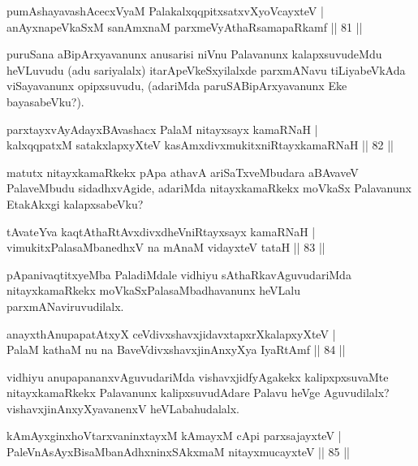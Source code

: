 \begin{shl}
pumAshayavashAcecxVyaM PalakalxqqpitxsatxvXyoVcayxteV |\\
anAyxnapeVkaSxM sanAmxnaM parxmeVyAthaRsamapaRkamf \hfill || 81 ||
\end{shl}

\begin{artha}
puruSana aBipArxyavanunx anusarisi niVnu Palavanunx kalapxsuvudeMdu heVLuvudu (adu 
sariyalalx) itarApeVkeSxyilalxde parxmANavu tiLiyabeVkAda viSayavanunx 
opipxsuvudu, (adariMda paruSABipArxyavanunx Eke bayasabeVku?).
\end{artha}

\begin{shl}
parxtayxvAyAdayxBAvashacx PalaM nitayxsayx kamaRNaH |\\
kalxqqpatxM satakxlapxyXteV kasAmxdivxmukitxniRtayxkamaRNaH \hfill || 82 ||
\end{shl}
	
\begin{artha}
matutx nitayxkamaRkekx pApa athavA ariSaTxveMbudara aBAvaveV PalaveMbudu sidadhxvAgide, adariMda nitayxkamaRkekx moVkaSx Palavanunx EtakAkxgi kalapxsabeVku?
\end{artha}

\begin{shl}
tAvateYva kaqtAthaRtAvxdivxdheVniRtayxsayx kamaRNaH |\\
vimukitxPalasaMbanedhxV na mAnaM vidayxteV tataH \hfill || 83 ||
\end{shl}

\begin{artha}
pApanivaqtitxyeMba PaladiMdale vidhiyu sAthaRkavAguvudariMda nitayxkamaRkekx moVkaSxPalasaMbadhavanunx heVLalu parxmANaviruvudilalx.
\end{artha}

\begin{shl}
anayxthA\s nupapatAtxyX ceVdivxshavxjidavxtapxrXkalapxyXteV |\\
PalaM kathaM nu na BaveVdivxshavxjinAnxyXya IyaRtAmf \hfill || 84 ||
\end{shl}

\begin{artha}
vidhiyu anupapananxvAguvudariMda vishavxjidfyAgakekx kalipxpxsuvaMte nitayxkamaRkekx Palavanunx kalipxsuvudAdare Palavu heVge Aguvudilalx? vishavxjinAnxyXyavanenxV heVLabahudalalx.
\end{artha}

\begin{shl}
kAmAyxginxhoVtarxvaninxtayxM kAmayxM cApi parxsajayxteV |\\
PaleVnAsAyxBisaMbanAdhxninxSAkxmaM nitayxmucayxteV \hfill || 85 ||
\end{shl}


